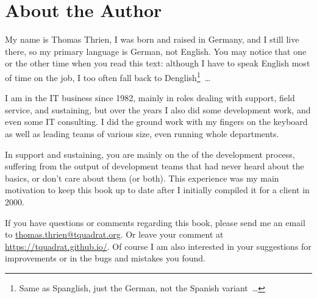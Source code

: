 \section{About the Author}
My name is Thomas Thrien, I was born and raised in Germany, and I still live there, so my primary language is German, not English. You may notice that one or the other time when you read this text: although I have to speak English most of time on the job, I too often fall back to Denglish\footnote{Same as Spanglish, just the German, not the Spanish variant~…}~…

I am in the IT business since 1982, mainly in roles dealing with support, field service, and sustaining, but over the years I also did some development work, and even some IT consulting. I did the ground work with my fingers on the keyboard as well as leading teams of various size, even running whole departments.

In support and sustaining, you are mainly on the  of the development process, suffering from the output of development teams that had never heard about the basics, or don't care about them (or both). This experience was my main motivation to keep this book up to date after I initially compiled it for a client in 2000.
 
If you have questions or comments regarding this book, please send me an email to \href{mailto:thomas.thrien@tquadrat.org}{thomas.thrien@tquadrat.org}. Or leave your comment at \url{https://tquadrat.github.io/}. Of course I am also interested in your suggestions for improvements or in the bugs and mistakes you found.

